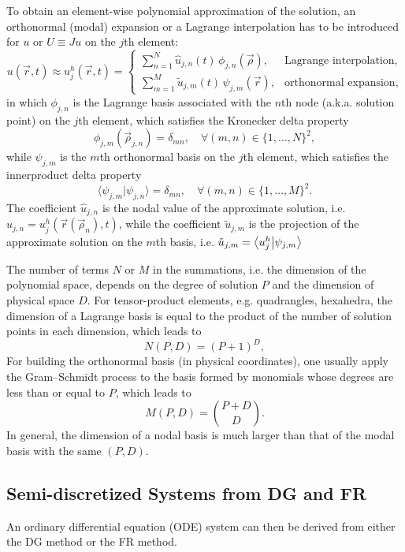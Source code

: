 \documentclass[10pt]{article}
\begin{document}
To obtain an element-wise polynomial approximation of the solution, an orthonormal (modal) expansion or a Lagrange interpolation has to be introduced for $u$ or $U\equiv Ju$ on the $j$th element:
$$
u(\vec{r},t)\approx u_{j}^{h}(\vec{r},t)=\begin{cases}
\sum_{n=1}^{N}\hat{u}_{j,n}(t)\,\phi_{j,n}(\vec{\rho}), & \text{Lagrange interpolation},\\
\sum_{m=1}^{M}\tilde{u}_{j,m}(t)\,\psi_{j,m}(\vec{r}), & \text{orthonormal expansion},
\end{cases}
$$
in which $\phi_{j,n}$ is the Lagrange basis associated with the $n$th node (a.k.a. solution point) on the $j$th element, which satisfies the Kronecker delta property
$$
\phi_{j,m}(\vec{\rho}_{j,n})=\delta_{mn},\quad\forall (m,n)\in\{1,\dots,N\}^2,
$$
while $\psi_{j,m}$ is the $m$th orthonormal basis on the $j$th element, which satisfies the innerproduct delta property
$$
\langle\psi_{j,m}\vert\psi_{j,n}\rangle=\delta_{mn},\quad\forall (m,n)\in\{1,\dots,M\}^2.
$$
%
The coefficient $\hat{u}_{j,n}$ is the nodal value of the approximate solution, i.e. $\hat{u}_{j,n}=u_j^h(\vec{r}(\vec{\rho}_n), t)$,
while the coefficient $\tilde{u}_{j,m}$ is the projection of the approximate solution on the $m$th basis, i.e. $\tilde{u}_{j,m}=\ip{u_j^h}{\psi_{j,m}}$

The number of terms $N$ or $M$ in the summations, i.e. the dimension of the polynomial space, depends on the degree of solution $P$ and the dimension of physical space $D$.
%
For tensor-product elements, e.g. quadrangles, hexahedra, the dimension of a Lagrange basis is equal to the product of the number of solution points in each dimension, which leads to
$$
N(P,D)=(P+1)^D,
$$
%
For building the orthonormal basis (in physical coordinates), one usually apply the Gram--Schmidt process to the basis formed by monomials whose degrees are less than or equal to $P$, which leads to
$$
M(P,D)=\binom{P+D}{D}.
$$
%
In general, the dimension of a nodal basis is much larger than that of the modal basis with the same $(P,D)$.

\subsection{Semi-discretized Systems from DG and FR}
An ordinary differential equation (ODE) system can then be derived from either the DG method or the FR method.
%
\end{document}
